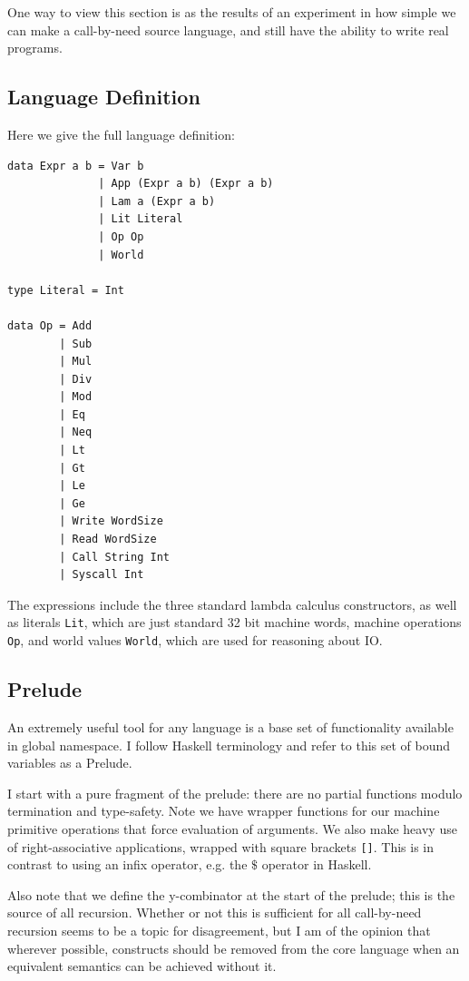One way to view this section is as the results of an experiment in how simple we
can make a call-by-need source language, and still have the ability to write
real programs. 

\subsection{Language Definition}

Here we give the full language definition: 

\begin{verbatim}
data Expr a b = Var b
              | App (Expr a b) (Expr a b)
              | Lam a (Expr a b)
              | Lit Literal
              | Op Op
              | World

type Literal = Int

data Op = Add 
        | Sub 
        | Mul 
        | Div 
        | Mod 
        | Eq 
        | Neq 
        | Lt 
        | Gt 
        | Le 
        | Ge 
        | Write WordSize 
        | Read WordSize 
        | Call String Int 
        | Syscall Int
\end{verbatim}

The expressions include the three standard lambda calculus constructors, as well
as literals \texttt{Lit}, which are just standard 32 bit machine words, machine
operations \texttt{Op}, and world values \texttt{World}, which are used for
reasoning about IO. 

\subsection{Prelude}
An extremely useful tool for any language is a base set of functionality
available in global namespace. I follow Haskell terminology and refer to this
set of bound variables as a Prelude. 

I start with a pure fragment of the prelude: there are no partial functions
modulo termination and type-safety. Note we have wrapper functions for our
machine primitive operations that force evaluation of arguments. We also make
heavy use of right-associative applications, wrapped with square brackets
\texttt{[]}. This is in contrast to using an infix operator, e.g. the $\$$
operator in Haskell.

Also note that we define the y-combinator at the start of the prelude; this is
the source of all recursion. Whether or not this is sufficient for all
call-by-need recursion seems to be a topic for disagreement, but I am of the
opinion that wherever possible, constructs should be removed from the core
language when an equivalent semantics can be achieved without it.

